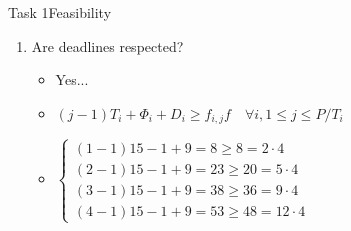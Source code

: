 \begin{frame}[allowframebreaks]{Task 1}{Feasibility\vspace{0.5cm}}
\begin{enumerate}
\begin{itemize}
        \item $\Phi_3=\min \left\{\begin{array}{l}(1-1) 4-(1-1) 10 \\ (3-1) 4-(2-1) 10 \\ (6-1) 4-(3-1) 10 \\ (8-1) 4-(4-1) 10 \\ (11-1) 4-(5-1) 10 \\ (13-1) 4-(6-1) 10\end{array} \quad=\min \left\{\begin{array}{l}0 \\ -2 \\ 0 \\ -2 \\ 0 \\ -2\end{array} = -2 \right.\right.$
        \item $\Phi_4=\min \left\{\begin{array}{l}(2-1) 4-(1-1) 6 \\ (3-1) 4-(2-1) 6 \\ (5-1) 4-(3-1) 6 \\ (6-1) 4-(4-1) 6 \\ (8-1) 4-(5-1) 6 \\ (9-1) 4-(6-1) 6 \\ (11-1) 4-(7-1) 6 \\ (12-1) 4-(8-1) 6 \\ (14-1) 4-(9-1) 6 \\ (15-1) 4-(10-1) 6\end{array} \quad=\min \left\{\begin{array}{l}4 \\ 2 \\ 4 \\ 2 \\ 4 \\ 2 \\ 4 \\ 2 \\ 4 \\ 2\end{array} = 2 \right.\right.$
      \end{itemize}
    \item Are deadlines respected?
      \begin{itemize}
        \item Yes...
        \item $(j-1) T_i+\Phi_i+D_i \geq f_{i, j} f \quad \forall i, 1 \leq j \leq P / T_i$
        \item $\left\{\begin{array}{l}(1-1) 15-1+9=8 \geq 8=2 \cdot 4 \\ (2-1) 15-1+9=23 \geq 20=5 \cdot 4 \\ (3-1) 15-1+9=38 \geq 36=9 \cdot 4 \\ (4-1) 15-1+9=53 \geq 48=12 \cdot 4\end{array}\right.$

\end{itemize}
\end{enumerate}
\end{frame}
